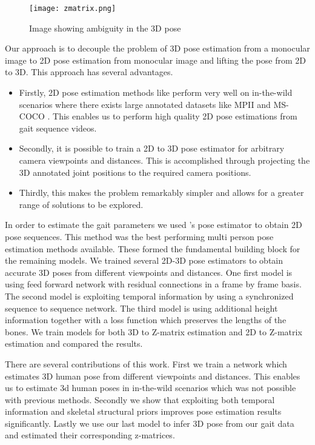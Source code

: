 \begin{figure}[htpb]
    \texttt{[image: zmatrix.png]}
    \caption{Image showing ambiguity in the 3D pose}
    \label{fig:ambiguity}
\end{figure}

Our approach is to decouple the problem of 3D pose estimation from a monocular image to 2D pose estimation from monocular image and lifting the pose from 2D to 3D. This approach has several advantages. 
\begin{itemize}
    \item Firstly, 2D pose estimation methods like \parencite{cao2016realtime} perform very well on in-the-wild scenarios where there exists large annotated datasets like MPII \parencite{andriluka20142d} and MS-COCO \parencite{lin2014microsoft}. This enables us to perform high quality 2D pose estimations from gait sequence videos.
    \item Secondly, it is possible to train a 2D to 3D pose estimator for arbitrary camera viewpoints and distances. This is accomplished through projecting the 3D annotated joint positions to the required camera positions.
    \item Thirdly, this makes the problem remarkably simpler and allows for a greater range of solutions to be explored.
\end{itemize}

In order to estimate the gait parameters we used \parencite{cao2016realtime}'s pose estimator to obtain 2D pose sequences. This method was the best performing multi person pose estimation methods available. These formed the fundamental building block for the remaining models. We trained several 2D-3D pose estimators to obtain accurate 3D poses from different viewpoints and distances. One first model is using feed forward network with residual connections in a frame by frame basis. The second model is exploiting temporal information by using a synchronized sequence to sequence network. The third model is using additional height information together with a loss function which preserves the lengths of the bones. We train models for both 3D to Z-matrix estimation and 2D to Z-matrix estimation and compared the results.

There are several contributions of this work. First we train a network which estimates 3D human pose from different viewpoints and distances. This enables us to estimate 3d human poses in in-the-wild  scenarios which was not possible with previous methods. Secondly we show that exploiting both  temporal information and skeletal structural priors improves pose estimation results significantly. Lastly we use our last model to infer 3D pose from our gait data and estimated their corresponding z-matrices.

